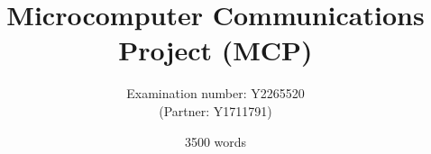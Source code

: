 \documentclass[10pt,twoside,openright]{report}
\title{Microcomputer Communications Project (MCP)}
\author{Examination number: Y2265520\\
(Partner: Y1711791)}
\date{3500 words}
\newenvironment{nowordcount}{}{}
\begin{document}
\maketitle

\newpage

\begin{nowordcount}
{\setlength{\parskip}{0.2\baselineskip}
    \tableofcontents
}

\newpage
{}
\end{nowordcount}








\appendix
\end{document}
